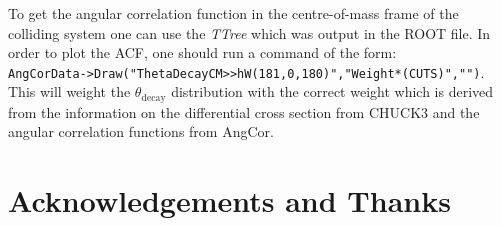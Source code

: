 \documentclass[a4paper,10pt]{article}
\begin{document}
To get the angular correlation function in the centre-of-mass frame of the colliding system one can use the {\it TTree} which was output in the ROOT file. In order to plot the ACF, one should run a command of the form:\\ \lstinline!AngCorData->Draw("ThetaDecayCM>>hW(181,0,180)","Weight*(CUTS)","")!. This will weight the $\theta_{\mathrm{decay}}$ distribution with the correct weight which is derived from the information on the differential cross section from CHUCK3 and the angular correlation functions from AngCor.

\section{Acknowledgements and Thanks}
\end{document}

